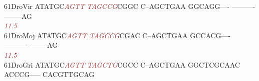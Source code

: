\documentclass[11pt,twoside,reqno,a4paper]{article}
\begin{document}
{61\hspace*{2\charwidth}DroVir	ATATGC\textit{\textcolor{Brown}{A}}\textit{\textcolor{Brown}{G}}\textit{\textcolor{Brown}{T}}\textit{\textcolor{Brown}{T}}	\textit{\textcolor{Brown}{T}}\textit{\textcolor{Brown}{A}}\textit{\textcolor{Brown}{G}}\textit{\textcolor{Brown}{C}}\textit{\textcolor{Brown}{C}}\textit{\textcolor{Brown}{G}}CGGC	C--AGCTGAA	GGCAGG----	----------	--------AG	\\
\hspace*{4\charwidth}\hspace*{7\charwidth}\hspace*{6\charwidth}\textit{\textcolor{Brown}{11.5}}\hspace*{1\charwidth}\hspace*{1\charwidth}\hspace*{1\charwidth}\hspace*{1\charwidth}\hspace*{1\charwidth}\hspace*{1\charwidth}\\
61\hspace*{2\charwidth}DroMoj	ATATGC\textit{\textcolor{Brown}{A}}\textit{\textcolor{Brown}{G}}\textit{\textcolor{Brown}{T}}\textit{\textcolor{Brown}{T}}	\textit{\textcolor{Brown}{T}}\textit{\textcolor{Brown}{A}}\textit{\textcolor{Brown}{G}}\textit{\textcolor{Brown}{C}}\textit{\textcolor{Brown}{C}}\textit{\textcolor{Brown}{G}}CGAC	C--AGCTGAA	GCCACG----	----------	--------AG	\\
\hspace*{4\charwidth}\hspace*{7\charwidth}\hspace*{6\charwidth}\textit{\textcolor{Brown}{11.5}}\hspace*{1\charwidth}\hspace*{1\charwidth}\hspace*{1\charwidth}\hspace*{1\charwidth}\hspace*{1\charwidth}\hspace*{1\charwidth}\\
61\hspace*{2\charwidth}DroGri	ATATGC\textit{\textcolor{Brown}{A}}\textit{\textcolor{Brown}{G}}\textit{\textcolor{Brown}{T}}\textit{\textcolor{Brown}{T}}	\textit{\textcolor{Brown}{T}}\textit{\textcolor{Brown}{A}}\textit{\textcolor{Brown}{G}}\textit{\textcolor{Brown}{C}}\textit{\textcolor{Brown}{T}}\textit{\textcolor{Brown}{G}}CGCC	C--AGCTGAA	GGCTCGCAAC	ACCCG-----	CACGTTGCAG	\\
}
\end{document}
